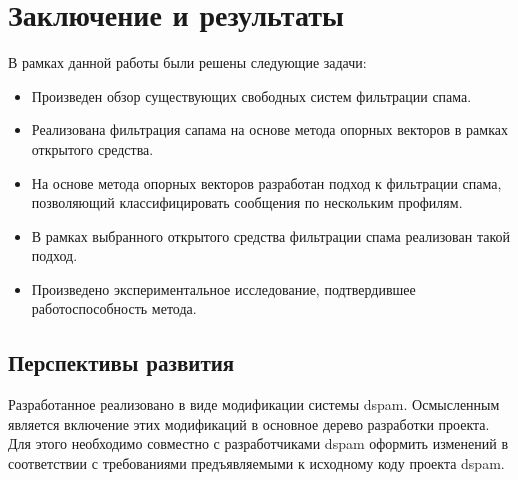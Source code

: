 \newpage
\section{Заключение и результаты}


В рамках данной	работы были решены следующие задачи:
\begin{itemize}
\item Произведен обзор существующих свободных систем фильтрации спама.
\item Реализована фильтрация сапама на основе метода опорных векторов в рамках открытого средства.
\item На основе метода опорных векторов разработан подход к фильтрации спама, позволяющий классифицировать сообщения по нескольким профилям.
\item В рамках выбранного открытого средства фильтрации спама реализован такой подход.
\item Произведено экспериментальное исследование, подтвердившее работоспособность метода.
\end{itemize}

\subsection{Перспективы развития}

Разработанное реализовано в виде модификации системы dspam. Осмысленным является включение этих модификаций в основное дерево разработки проекта. Для этого необходимо совместно с разработчиками dspam оформить изменений в соответствии с требованиями предъявляемыми к исходному коду проекта dspam. 
